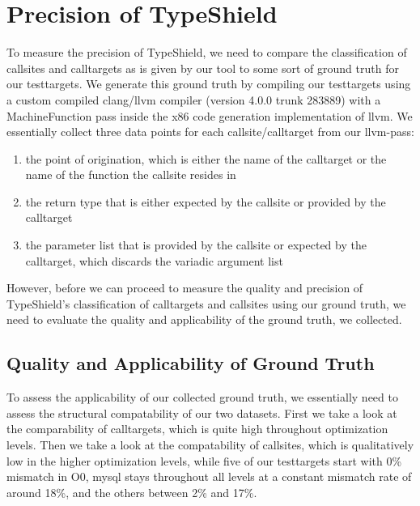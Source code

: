 \section{Precision of TypeShield}
\label{section:typeshieldprecision}

To measure the precision of TypeShield, we need to compare the classification of callsites and calltargets as is given by our tool to some sort of ground truth for our testtargets. We generate this ground truth by compiling our testtargets using a custom compiled clang/llvm compiler (version 4.0.0 trunk 283889) with a MachineFunction pass inside the x86 code generation implementation of llvm. We essentially collect three data points for each callsite/calltarget from our llvm-pass:
\begin{enumerate}
\item the point of origination, which is either the name of the calltarget or the name of the function the callsite resides in
\item the return type that is either expected by the callsite or provided by the calltarget
\item the parameter list that is provided by the callsite or expected by the calltarget, which discards the variadic argument list
\end{enumerate}
However, before we can proceed to measure the quality and precision of TypeShield's classification of calltargets and callsites using our ground truth, we need to evaluate the quality and applicability of the ground truth, we collected.

\subsection{Quality and Applicability of Ground Truth}
\label{subsection:typeshieldprecision}
To assess the applicability of our collected ground truth, we essentially need to assess the structural compatability of our two datasets. First we take a look at the comparability of calltargets, which is quite high throughout optimization levels. Then we take a look at the compatability of callsites, which is qualitatively low in the higher optimization levels, while five of our testtargets start with 0\% mismatch in O0, mysql stays throughout all levels at a constant mismatch rate of around 18\%, and the others between 2\% and 17\%.

